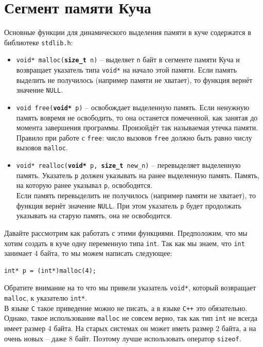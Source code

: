 \documentclass{article}
\begin{document}
\newpage
\section*{Сегмент памяти Куча}
Основные функции для динамического выделения памяти в куче содержатся в библиотеке \texttt{stdlib.h}:
\begin{itemize}
\item \texttt{void* malloc(\textbf{size\_t} n)} -- выделяет \texttt{n} байт в сегменте памяти Куча и возвращает указатель типа \texttt{void*} на начало этой памяти. Если память выделить не получилось (например памяти не хватает), то функция вернёт значение \texttt{NULL}. \\
\item \texttt{void free(\textbf{void*} p)} -- освобождает выделенную память. Если ненужную память вовремя не освободить, то она останется помеченной, как занятая до момента завершения программы. Произойдёт так называемая утечка памяти. Правило при работе с \texttt{free}: число вызовов \texttt{free} должно быть равно числу вызовов \texttt{malloc}.\\
\item \texttt{void* realloc(\textbf{void*} p, \textbf{size\_t} new\_n)} -- перевыделяет выделенную память. Указатель \texttt{p} должен указывать на ранее выделенную память. Память, на которую ранее указывал \texttt{p}, освободится. \\
Если память перевыделить не получилось (например памяти не хватает), то функция вернёт значение \texttt{NULL}. При этом указатель \texttt{p} будет продолжать указывать на старую память, она не освободится.\\
\end{itemize}

Давайте рассмотрим как работать с этими функциями. Предположим, что мы хотим создать в куче одну переменную типа \texttt{int}. Так как мы знаем, что \texttt{int} занимает 4 байта, то мы можем написать следующее:
\begin{lstlisting}
int* p = (int*)malloc(4);
\end{lstlisting}
Обратите внимание на то что мы привели указатель \texttt{void*}, который возвращает \texttt{malloc}, к указателю \texttt{int*}.\\
В языке \texttt{C} такое приведение можно не писать, а в языке \texttt{C++} это обязательно. Однако, такое использование \texttt{malloc} не совсем верно, так как тип \texttt{int} не всегда имеет размер 4 байта. На старых системах он может иметь размер 2 байта, а на очень новых -- даже 8 байт. Поэтому лучше использовать оператор \texttt{sizeof}.\\
\end{document}
